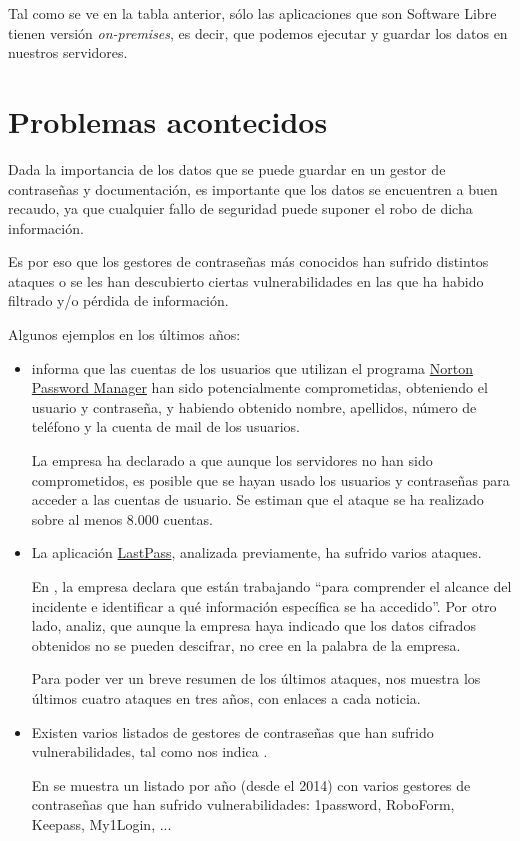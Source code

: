 \documentclass{\ClassPath/viu-tfm-template}
\begin{document}
Tal como se ve en la tabla anterior, sólo las aplicaciones que son Software Libre tienen versión \textit{on-premises}, es decir, que podemos ejecutar y guardar los datos en nuestros servidores.


\section{Problemas acontecidos}

Dada la importancia de los datos que se puede guardar en un gestor de contraseñas y documentación, es importante que los datos se encuentren a buen recaudo, ya que cualquier fallo de seguridad puede suponer el robo de dicha información.

Es por eso que los gestores de contraseñas más conocidos han sufrido distintos ataques o se les han descubierto ciertas vulnerabilidades en las que ha habido filtrado y/o pérdida de información.

Algunos ejemplos en los últimos años:

\begin{itemize}
    \item \textcite{norton} informa que las cuentas de los usuarios que utilizan el programa \href{https://us.norton.com/feature/password-manager}{Norton Password Manager} han sido potencialmente comprometidas, obteniendo el usuario y contraseña, y habiendo obtenido nombre, apellidos, número de teléfono y la cuenta de mail de los usuarios.

    La empresa ha declarado a \textcite{norton2} que aunque los servidores no han sido comprometidos, es posible que se hayan usado los usuarios y contraseñas para acceder a las cuentas de usuario. Se estiman que el ataque se ha realizado sobre al menos 8.000 cuentas.

    \item La aplicación \href{https://www.lastpass.com/}{LastPass}, analizada previamente, ha sufrido varios ataques.

    En \textcite{lastpass}, la empresa declara que están trabajando “para comprender el alcance del incidente e identificar a qué información específica se ha accedido”. Por otro lado, \textcite{lastpass2} analiz, que aunque la empresa haya indicado que los datos cifrados obtenidos no se pueden descifrar, no cree en la palabra de la empresa.

    Para poder ver un breve resumen de los últimos ataques, \textcite{lastpass3} nos muestra los últimos cuatro ataques en tres años, con enlaces a cada noticia.

    \item Existen varios listados de gestores de contraseñas que han sufrido vulnerabilidades, tal como nos indica \textcite{hacked2}.

    En \textcite{hacked} se muestra un listado por año (desde el 2014) con varios gestores de contraseñas que han sufrido vulnerabilidades: 1password, RoboForm, Keepass, My1Login, ...

\end{itemize}
\end{document}
